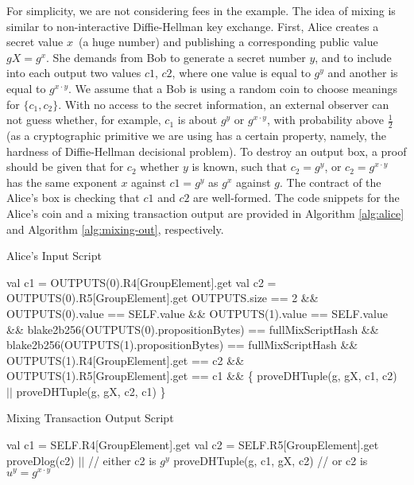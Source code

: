  For simplicity, we are not considering fees in the example. The idea of mixing is similar to non-interactive
 Diffie-Hellman key exchange. First, Alice creates a secret value $x$~(a huge number) and publishing a corresponding
 public value $gX = g^x$. She demands from Bob to generate a secret number $y$, and to include into each output two
 values $c1$, $c2$, where one value is equal to $g^y$ and another is equal to $g^{x \cdot y}$. We assume that a Bob is using
 a random coin to choose meanings for $\{c_1, c_2\}$. With no access to the secret information, an external
 observer can not guess whether, for example, $c_1$ is about $g^y$ or $g^{x \cdot y}$, with probability above
 $\frac{1}{2}$ (as a cryptographic primitive we are using has a certain property, namely, the hardness of
 Diffie-Hellman decisional problem). To destroy an output box, a proof should be given that for $c_2$ whether $y$ is known,
  such that $c_2 = g^y$, or $c_2 = g^{x \cdot y}$ has the same exponent $x$ against $c1 = g^y$ as $g^x$ against $g$.
 The contract of the Alice's box is checking that $c1$ and $c2$ are well-formed. The code snippets for the Alice's coin and
 a mixing transaction output are provided in Algorithm \ref{alg:alice} and Algorithm \ref{alg:mixing-out}, respectively.

 \begin{algorithm}[H]
    \caption{Alice's Input Script}
    \label{alg:alice}
    \begin{algorithmic}[1]
        \State val c1 = OUTPUTS(0).R4[GroupElement].get
        \State val c2 = OUTPUTS(0).R5[GroupElement].get
        \State
        \State OUTPUTS.size == 2 \&\&
        \State OUTPUTS(0).value == SELF.value \&\&
        \State OUTPUTS(1).value == SELF.value \&\&
        \State blake2b256(OUTPUTS(0).propositionBytes) == fullMixScriptHash \&\&
        \State blake2b256(OUTPUTS(1).propositionBytes) == fullMixScriptHash \&\&
        \State OUTPUTS(1).R4[GroupElement].get == c2 \&\&
        \State OUTPUTS(1).R5[GroupElement].get == c1 \&\& \{
        \State\hspace{\algorithmicindent}  proveDHTuple(g, gX, c1, c2) $||$
        \State\hspace{\algorithmicindent}  proveDHTuple(g, gX, c2, c1)
        \State \}
    \end{algorithmic}
 \end{algorithm}

 \begin{algorithm}[H]
    \caption{Mixing Transaction Output Script}
    \label{alg:mixing-out}
    \begin{algorithmic}[1]
        \State val c1 = SELF.R4[GroupElement].get
        \State val c2 = SELF.R5[GroupElement].get
        \State proveDlog(c2) $||$            // either c2 is $g^y$
        \State proveDHTuple(g, c1, gX, c2) // or c2 is $u^y = g^{x \cdot y}$
    \end{algorithmic}
 \end{algorithm}

